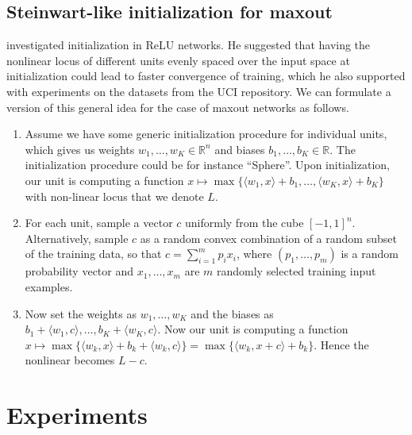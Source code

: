 \documentclass{article}
\theoremstyle{definition}
\begin{document}
\subsection{Steinwart-like initialization for maxout}
\citet{steinwart2019sober} investigated initialization in ReLU networks. 
He suggested that having the nonlinear locus of different units evenly spaced over the input space at initialization could lead to faster convergence of training, which he also supported with experiments on the datasets from the UCI repository. 
We can formulate a version of this general idea for the case of maxout networks as follows. 
\begin{enumerate}[leftmargin=*]
\item 
Assume we have some generic initialization procedure for individual units, which gives us weights $w_1,\ldots,  w_K\in \mathbb{R}^n$ and biases $b_1,\ldots, b_K\in\mathbb{R}$. 
The initialization procedure could be for instance ``Sphere''. 
Upon initialization, our unit is computing a function $x\mapsto \max\{\langle w_1,x\rangle +b_1,\ldots, \langle w_K , x\rangle +b_K\}$ with non-linear locus that we denote $L$. 

\item 
For each unit, sample a vector $c$ uniformly from the cube $[-1,1]^{n}$.
Alternatively, sample $c$ as a random convex combination of a random subset of the training data, so that $c=\sum_{i=1}^m p_i x_i$, where $(p_1,\ldots, p_m)$ is a random probability vector and $x_1,\ldots, x_m$ are $m$ randomly selected training input examples. 
\item Now set the weights as $w_1,\ldots, w_K$ and the biases as $b_1 + \langle w_1,c\rangle, \ldots, b_K + \langle w_K,c\rangle$. 
Now our unit is computing a function $x\mapsto \max\{\langle w_k, x\rangle + b_k + \langle w_k, c\rangle \} = \max\{\langle w_k, x + c\rangle + b_k\}$. Hence the nonlinear becomes $L-c$. 
\end{enumerate}

\section{Experiments}
\label{app:experiments}
\end{document}
